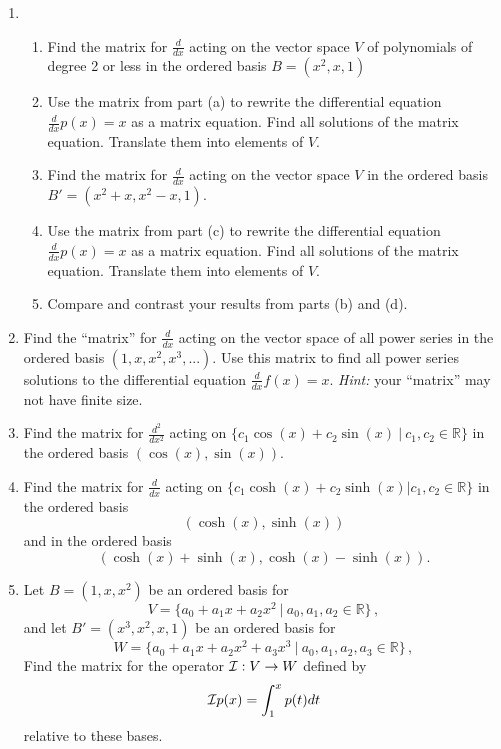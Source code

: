 \begin{enumerate}
\item
\begin{enumerate}
\item
Find the matrix for $\frac{d}{dx}$ acting on the vector space $V$ of polynomials of degree 2 or less in  the ordered basis $B=(x^2,x,1)$\\
\item Use the matrix from part (a) to rewrite the differential equation $\frac{d}{dx} p(x)=x$ as a matrix equation. Find all solutions of the matrix equation. Translate them into elements of $V$.\\\item Find  the matrix for $\frac{d}{dx}$ acting on the vector space $V$  in the ordered basis  $B'=(x^2+x,x^2-x,1)$.\\ 
\item  Use the matrix from part (c) to rewrite the differential equation $\frac{d}{dx} p(x)=x$ as a matrix equation. Find all solutions of the matrix equation. Translate them into elements of $V$.\\
\item Compare and contrast your results from parts (b) and (d).
\end{enumerate}

\item Find the ``matrix'' for $\frac{d}{dx}$ acting on the vector space of all power series in the ordered basis $(1,x,x^2,x^3,...)$. Use this matrix to find all power series solutions to the differential equation $\frac{d}{dx} f(x)=x$. {\itshape Hint:} your ``matrix'' may not have finite size.\\


\item Find the matrix for $\frac{d^2}{dx^2}$ acting on 
$\{ c_1 \cos(x)+c_2 \sin(x)  ~|~c_1,c_2\in \mathbb{R}\}$ in the ordered basis $(\cos(x),\sin(x))$.\\

\item Find the matrix for $\frac{d}{dx}$ acting on $\{ c_1 \cosh(x)+c_2 \sinh(x) |c_1,c_2\in \mathbb{R}\}$ in the ordered basis 
\[(\cosh(x),\sinh(x))\] 
and in the ordered basis  \[(\cosh(x)+\sinh(x), \cosh(x)-\sinh(x)).\]

\item Let $B=(1,x,x^2)$ be an ordered basis for
\[V=\{ a_0+a_1x+a_2x^2~|~ a_0,a_1,a_2 \in \mathbb{R}\}\, ,\] 
and let 
$B'=(x^3,x^2,x,1)$ be an ordered basis for 
\[W=\{ a_0+a_1x+a_2x^2+a_3x^3 ~|~  a_0,a_1,a_2,a_3 \in \mathbb{R}\}\, ,\]  
Find the matrix for the operator ${\cal I}:V\to W$  defined by \[{\cal I}p(x)=\int_1^x p(t)dt\] relative to these bases.



\end{enumerate}

